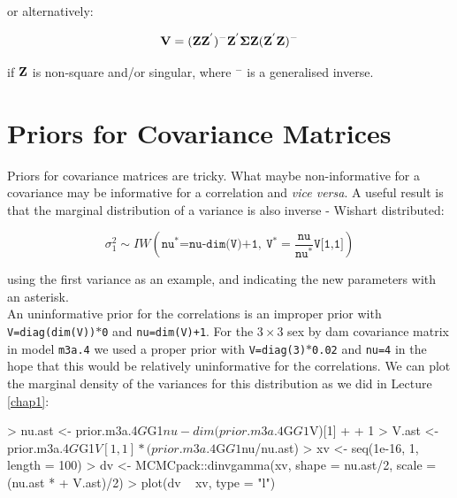 \documentclass{article}
\begin{document}
or alternatively: 

\begin{equation}
{\bf V} = ({\bf Z}{\bf Z}^{'})^{-}{\bf Z}^{'}{\bm \Sigma}{\bf Z}({\bf Z}^{'}{\bf Z})^{-}
\end{equation}

if ${\bf Z}$ is non-square and/or singular, where \texttt{$^{-}$} is a generalised inverse.\\

 
\section{Priors for Covariance Matrices}

Priors for covariance matrices are tricky. What maybe non-informative for a covariance may be informative for a correlation and \emph{vice versa}. A useful result is that the marginal distribution of a variance is also inverse - Wishart distributed:


\begin{displaymath}
\sigma^{2}_{1} \sim IW\left(\texttt{nu}^{\ast}\texttt{=nu-dim(V)+1},\ \texttt{V}^{\ast}=\frac{\texttt{nu}}{\texttt{nu}^{\ast}}\texttt{V[1,1]}\right)
\end{displaymath}

using the first variance as an example, and indicating the new parameters with an asterisk.\\

An uninformative prior for the correlations is an improper prior with \texttt{V=diag(dim(V))$\ast$0} and \texttt{nu=dim(V)+1}. For the $3\times3$ sex by dam covariance matrix in model \texttt{m3a.4} we used a proper prior with \texttt{V=diag(3)$\ast$0.02} and \texttt{nu=4} in the hope that this would be relatively uninformative for the correlations. We can plot the marginal density of the variances for this distribution as we did in Lecture \ref{chap1}:

\begin{Schunk}
\begin{Sinput}
> nu.ast <- prior.m3a.4$G$G1$nu - dim(prior.m3a.4$G$G1$V)[1] + 
+     1
> V.ast <- prior.m3a.4$G$G1$V[1, 1] * (prior.m3a.4$G$G1$nu/nu.ast)
> xv <- seq(1e-16, 1, length = 100)
> dv <- MCMCpack::dinvgamma(xv, shape = nu.ast/2, scale = (nu.ast * 
+     V.ast)/2)
> plot(dv ~ xv, type = "l")
\end{Sinput}
\end{Schunk}
\end{document}
